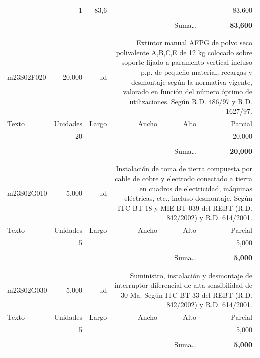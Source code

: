 \documentclass{book}%
\begin{document}
\begin{longtable}{lrrrrr}
\hline%
\multicolumn{1}{p{3.5cm}}{ }&1&83,6&&&    83,600\\%
&&&&&\\%
\multicolumn{5}{r}{Suma\ldots}&\textbf{    83,600}\\%
\hline%
&&&&&\\%
&&&&&\\%
m23S02F020&    20,000& ud&\multicolumn{3}{p{6cm}}{\scriptsize Extintor manual AFPG de polvo seco polivalente A,B,C,E de 12 kg colocado sobre soporte fijado a paramento vertical incluso p.p. de pequeño material, recargas y desmontaje según la normativa vigente, valorado en función del número óptimo de utilizaciones. Según R.D. 486/97 y R.D. 1627/97.\normalsize}\\%
Texto&Unidades&Largo&Ancho&Alto&Parcial\\%
\hline%
\multicolumn{1}{p{3.5cm}}{ }&20&&&&    20,000\\%
&&&&&\\%
\multicolumn{5}{r}{Suma\ldots}&\textbf{    20,000}\\%
\hline%
&&&&&\\%
&&&&&\\%
m23S02G010&     5,000& ud&\multicolumn{3}{p{6cm}}{\scriptsize Instalación de toma de tierra compuesta por cable de cobre y electrodo conectado a tierra en cuadros de electricidad, máquinas eléctricas, etc., incluso desmontaje. Según ITC-BT-18 y MIE-BT-039 del REBT (R.D. 842/2002) y R.D. 614/2001.\normalsize}\\%
Texto&Unidades&Largo&Ancho&Alto&Parcial\\%
\hline%
\multicolumn{1}{p{3.5cm}}{ }&5&&&&     5,000\\%
&&&&&\\%
\multicolumn{5}{r}{Suma\ldots}&\textbf{     5,000}\\%
\hline%
&&&&&\\%
&&&&&\\%
m23S02G030&     5,000& ud&\multicolumn{3}{p{6cm}}{\scriptsize Suministro, instalación y desmontaje de interruptor diferencial de alta sensibilidad de 30 Ma. Según ITC-BT-33 del REBT (R.D. 842/2002) y R.D. 614/2001.\normalsize}\\%
Texto&Unidades&Largo&Ancho&Alto&Parcial\\%
\hline%
\multicolumn{1}{p{3.5cm}}{ }&5&&&&     5,000\\%
&&&&&\\%
\multicolumn{5}{r}{Suma\ldots}&\textbf{     5,000}\\%
\hline%
&&&&&\\%

\end{longtable}
\end{document}
